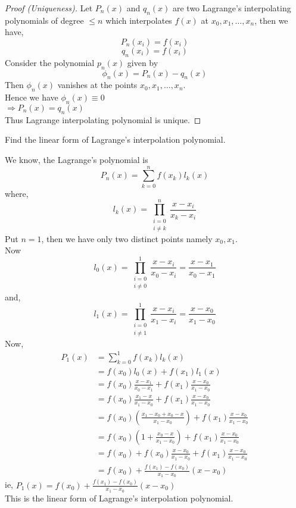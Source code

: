 \documentclass[12pt,class=book,crop=false]{standalone}
\begin{document}
\begin{proof}[Proof (Uniqueness)]
    Let \(  P_n(x) \) and \(  q_n(x) \) are two Lagrange's interpolating polynomials of degree \(  \leq n \) which interpolates \(  f(x) \) at \(  x_0,x_1,\dots,x_n \), then we have,
    \begin{equation}
        P_n(x_i)=f(x_i) \label{eq:uniq1}
    \end{equation}
    \begin{equation}
        q_n(x_i)=f(x_i)\label{eq:uniq2}
    \end{equation}
    Consider the polynomial \(  p_n(x) \) given by
    \[\phi_n(x)=P_n(x)-q_n(x)\]
    Then \(  \phi_n(x) \) vanishes at the points \(  x_0,x_1,\dots,x_n \).\\
    Hence we have \(  \phi_n(x)\equiv 0 \)\\
    \(  \Rightarrow P_n(x)=q_n(x) \)\\
    Thus Lagrange interpolating polynomial is unique.
\end{proof}
\begin{prob}
    Find the linear form of Lagrange's interpolation polynomial.
\end{prob}
\begin{soln}
    We know, the Lagrange's polynomial is
    \[P_n(x)=\sum_{k=0}^nf(x_k)l_k(x)\]
    where,
    \[l_k(x)=\prod_{\substack{i=0\\ i\neq k}}^n\frac{x-x_i}{x_k-x_i}\]
    Put \(  n=1 \), then we have only two distinct points namely \(  x_0,x_1 \).\\
    Now\[l_0(x)=\prod_{\substack{i=0\\ i\neq 0}}^1\frac{x-x_i}{x_0-x_i}=\frac{x-x_1}{x_0-x_1}\]
    and,\[l_1(x)=\prod_{\substack{i=0\\ i\neq 1}}^1\frac{x-x_i}{x_1-x_i}=\frac{x-x_0}{x_1-x_0}\]
    Now,
    \begin{align*}
        P_1(x) & = \sum_{k=0}^1f(x_k)l_k(x)                                                    \\
               & = f(x_0)l_0(x)+f(x_1)l_1(x)                                                   \\
               & = f(x_0)\frac{x-x_1}{x_0-x_1}+f(x_1)\frac{x-x_0}{x_1-x_0}                     \\
               & = f(x_0)\frac{x_1-x}{x_1-x_0}+f(x_1)\frac{x-x_0}{x_1-x_0}                     \\
               & =f(x_0)\left(\frac{x_1-x_0+x_0-x}{x_1-x_0}\right)+f(x_1)\frac{x-x_0}{x_1-x_0} \\
               & = f(x_0)\left(1+\frac{x_0-x}{x_1-x_0}\right)+f(x_1)\frac{x-x_0}{x_1-x_0}      \\
               & = f(x_0)+ f(x_0) \frac{x-x_0}{x_1-x_0}+f(x_1)\frac{x-x_0}{x_1-x_0}            \\
               & = f(x_0)+\frac{f(x_1)-f(x_0)}{x_1-x_0}\left(x-x_0\right)
    \end{align*}
    ie, \(  P_1(x)= f(x_0)+\frac{f(x_1)-f(x_0)}{x_1-x_0}\left(x-x_0\right) \)\\

    This is the linear form of Lagrange's interpolation polynomial.
\end{soln}
\end{document}
